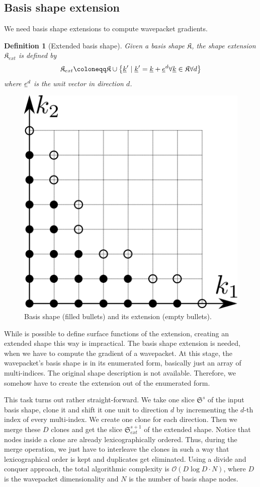 \documentclass{article}
\newtheorem{definition}{Definition}
\begin{document}
\subsection{Basis shape extension}

We need basis shape extensions to compute wavepacket gradients.

\begin{definition}[Extended basis shape]
  Given a basis shape \( \mathfrak{K} \),
  the shape extension \( \mathfrak{K}_{ext} \) is defined by
  \begin{equation}
    \mathfrak{K}_{ext} \coloneqq \mathfrak{K} \cup 
    \left\{\mindex{k}' \mid \mindex{k}' = \mindex{k} + \mindex{e}^d 
      \forall \mindex{k} \in \mathfrak{K} \forall d\right\}
  \end{equation}
  where \( \underline{e}^d \) is the unit vector in direction \( d \).
\end{definition}

\begin{figure}[H]
  \begin{center}
    \includegraphics[width=0.5\linewidth]{shape_extension}
  \end{center}
  \caption{Basis shape (filled bullets) and its extension (empty
    bullets).}
\end{figure}

While is possible to define surface functions of the extension,
creating an extended shape this way is impractical.
The basis shape extension is needed, when
we have to compute the gradient of a wavepacket. At this stage,
the wavepacket's basis shape is in its enumerated form,
basically just an array of multi-indices. The original shape description is not available.
Therefore, we somehow have to create the extension out of the enumerated form.
\par
This task turns out rather straight-forward. We take one slice \(\mathfrak{S}^s\) of
the input basis shape, clone it and
shift it one unit to direction \(d\) by incrementing the \(d\)-th index of every multi-index.
We create one clone for each direction. Then we merge these \(D\) clones and get the
slice \(\mathfrak{S}_{ext}^{s+1}\) of the extended shape.
Notice that nodes inside a clone are already lexicographically ordered.
Thus, during the merge operation, we just have to interleave the clones in such a way that
lexicographical order is kept and duplicates get eliminated.
Using a divide and conquer approach, the total algorithmic complexity is
\(\mathcal{O}(D\log{}D \cdot N)\), where \(D\) is the wavepacket dimensionality and \(N\)
is the number of basis shape nodes.
\end{document}
